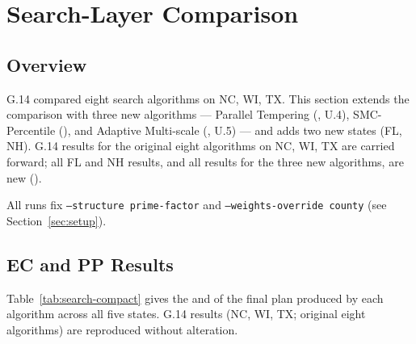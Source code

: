 \section{Search-Layer Comparison}
\label{sec:search}

\subsection{Overview}

G.14 compared eight search algorithms on NC, WI, TX.
This section extends the comparison with three new algorithms --- Parallel
Tempering (\pt{}, U.4), SMC-Percentile (\smcp{}), and Adaptive Multi-scale
(\ams{}, U.5) --- and adds two new states (FL, NH).
G.14 results for the original eight algorithms on NC, WI, TX are carried
forward; all FL and NH results, and all results for the three new algorithms,
are new (\dag{}).

All runs fix \texttt{--structure prime-factor} and \texttt{--weights-override county}
(see Section~\ref{sec:setup}).

\subsection{EC and PP Results}

Table~\ref{tab:search-compact} gives the \ec{} and \pp{} of the final plan
produced by each algorithm across all five states.
G.14 results (NC, WI, TX; original eight algorithms) are reproduced without
alteration.

